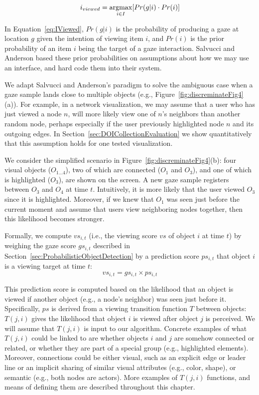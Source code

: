\begin{equation}
i_{viewed} = \displaystyle \operatorname*{argmax}_{i\in I}[Pr(g|i)\cdot Pr(i)]
\label{eq:IViewed}
\end{equation}

In Equation~\ref{eq:IViewed}, $Pr(g|i)$ is the probability of producing a gaze at location $g$ given the intention of viewing item $i$, and $Pr(i)$ is the prior probability of an item $i$  being the target of a gaze interaction. Salvucci and Anderson based these prior probabilities on assumptions about how we may use an interface, and hard code them into their system.  

We adapt Salvucci and Anderson's paradigm to solve the ambiguous case when a gaze sample lands close to multiple objects (e.g.,  Figure~\ref{fig:discreminateFig4}(a)). For example, in a network visualization, we may assume that a user who has just viewed a node $n$, will more likely view one of $n$'s neighbors than another random node, perhaps especially if the user previously highlighted node $n$ and its outgoing edges.  In Section~\ref{sec:DOICollectionEvaluation} we show quantitatively that this assumption holds for one tested visualization.  

We consider the simplified scenario in Figure~\ref{fig:discreminateFig4}(b): four visual objects ($O_{1\ldots 4}$), two of which are connected ($O_1$ and $O_3$), and one of which is highlighted ($O_3$), are shown on the screen. A new gaze sample registers between $O_3$ and $O_4$ at time $t$. Intuitively, it is more likely that the user viewed $O_3$ since it is highlighted. Moreover, if we knew that $O_1$ was seen just before the current moment and assume that users view neighboring nodes together, then this likelihood becomes stronger.         
 
Formally, we compute $vs_{i,t}$  (i.e., the viewing score $vs$ of object $i$ at time $t$) by weighing the gaze score $gs_{i,t}$ described in Section~\ref{sec:ProbabilisticObjectDetection} by a prediction score $ps_{i,t}$ that object $i$ is a viewing target at time $t$:  
\begin{equation}
vs_{i,t} = gs_{i,t} \times ps_{i,t}
\label{eq:VS}
\end{equation}

This prediction score is computed based on the likelihood that an object is viewed if another object (e.g.,  a node's neighbor) was seen just before it. Specifically, $ps$ is derived from a viewing transition function $T$ between objects:  $T(j,i)$ gives the likelihood that object $i$ is viewed after object $j$ is perceived. We will assume that $T(j, i)$ is input to our algorithm. Concrete examples of what $T(j, i)$ could be linked to are whether objects $i$ and $j$ are somehow connected or related, or whether they are part of a special group (e.g., highlighted elements). Moreover, connections could be either visual, such as an explicit edge or leader line or an implicit sharing of similar visual attributes (e.g., color, shape), or semantic (e.g., both nodes are actors). More examples of $T(j, i)$ functions, and means of defining them are described throughout this chapter.

